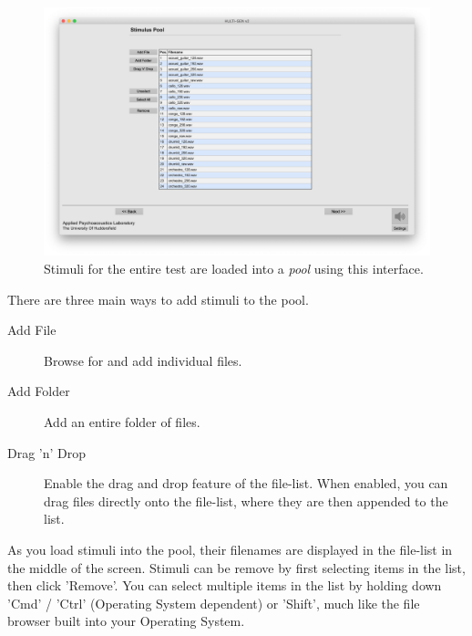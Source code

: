\begin{figure}[ht]
	\centering
	\includegraphics[width=1.0\textwidth]{./images/createTest_step05_stimlusPool.png}
	\caption{Stimuli for the entire test are loaded into a \emph{pool} using this interface.}
	\label{create::stimulusPool}
\end{figure}

\noindent
There are three main ways to add stimuli to the pool.
\begin{description}
	\item[Add File] Browse for and add individual files.
	\item[Add Folder] Add an entire folder of files.
	\item[Drag 'n' Drop] Enable the drag and drop feature of the file-list. When enabled, you can drag files directly onto the file-list, where they are then appended to the list.
\end{description}

\noindent
As you load stimuli into the pool, their filenames are displayed in the file-list in the middle of the screen. Stimuli can be remove by first selecting items in the list, then click 'Remove'. You can select multiple items in the list by holding down 'Cmd' / 'Ctrl' (Operating System dependent) or 'Shift', much like the file browser built into your Operating System.
